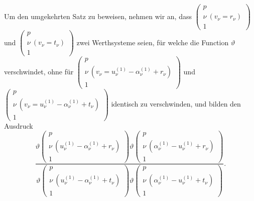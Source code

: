 \documentclass[12pt,a4paper]{article}
\begin{document}
Um den umgekehrten Satz zu beweisen, nehmen wir an, dass $\left(\begin{array}{c} p\\ \nu\ (v_\nu = r_\nu)\\ 1 \end{array}\right)$ und $\left(\begin{array}{c} p\\ \nu\ (v_\nu = t_\nu)\\ 1 \end{array}\right)$ zwei Werthsysteme seien, für welche die Function $\vartheta$ verschwindet, ohne für $\left(\begin{array}{c} p\\ \nu\ (v_\nu = u_\nu^{(1)} - \alpha_\nu^{(1)} + r_\nu)\\ 1 \end{array}\right)$ und $\left(\begin{array}{c} p\\ \nu\ (v_\nu = u_\nu^{(1)} - \alpha_\nu^{(1)} + t_\nu)\\ 1 \end{array}\right)$ identisch zu verschwinden, und bilden den Ausdruck
\begin{equation}
\tag{2}
\frac{\vartheta\left(\begin{array}{c} p\\ \nu\ (u_\nu^{(1)} - \alpha_\nu^{(1)} + r_\nu)\\ 1 \end{array}\right) \vartheta\left(\begin{array}{c} p\\ \nu\ (\alpha_\nu^{(1)} - u_\nu^{(1)} + r_\nu)\\ 1 \end{array}\right)}{\vartheta\left(\begin{array}{c} p\\ \nu\ (u_\nu^{(1)} - \alpha_\nu^{(1)} + t_\nu)\\ 1 \end{array}\right) \vartheta\left(\begin{array}{c} p\\ \nu\ (\alpha_\nu^{(1)} - u_\nu^{(1)} + t_\nu)\\ 1 \end{array}\right)}. \end{equation}
\end{document}
